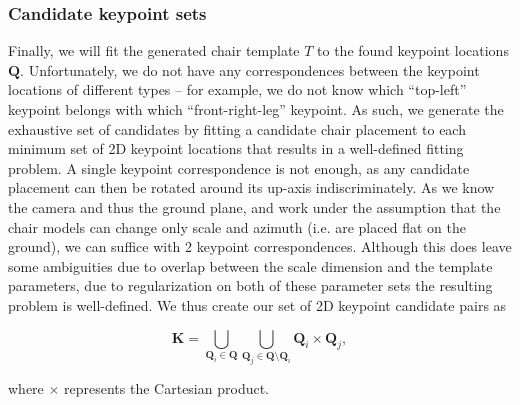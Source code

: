 \documentclass[10pt,twocolumn,letterpaper]{article}
\newcommand{\bb}[1]{{\bm{#1}}}
\begin{document}
\vspace{-1mm}
\subsubsection{Candidate keypoint sets}
Finally, we will fit the generated chair template $T$ to the found keypoint
locations $\bb{Q}$.  Unfortunately, we do not have any correspondences between the
keypoint locations of different types -- for example, we do not know which
``top-left'' keypoint belongs with which ``front-right-leg'' keypoint.  As
such, we generate the exhaustive set of candidates by fitting a candidate chair
placement to each minimum set of 2D keypoint locations that results in a
well-defined fitting problem. A single keypoint correspondence is not enough,
as any candidate placement can then be rotated around its up-axis
indiscriminately. As we know the camera and thus the ground plane, and work
under the assumption that the chair models can change only scale and azimuth
(i.e. are placed flat on the ground), we can suffice with 2 keypoint
correspondences. Although this does leave some ambiguities due to overlap
between the scale dimension and the template parameters, due to regularization
on both of these parameter sets the resulting problem is well-defined. We thus
create our set of 2D keypoint candidate pairs as

\[ \bb{K} = \bigcup_{\bb{Q}_i \in \bb{Q}}\bigcup_{\bb{Q}_j \in \bb{Q}\setminus{}\bb{Q}_i} \bb{Q}_i \times \bb{Q}_j, \]

where $\times$ represents the Cartesian product.
\end{document}
